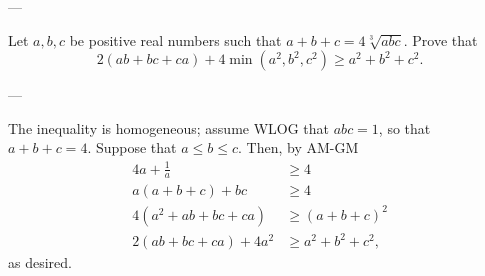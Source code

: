 
---

Let $a,b,c$ be positive real numbers such that $a+b+c=4\sqrt[3]{abc}$. Prove that \[2(ab+bc+ca)+4\min(a^2,b^2,c^2)\ge a^2+b^2+c^2.\]

---

The inequality is homogeneous; assume WLOG that $abc=1$, so that $a+b+c=4$. Suppose that $a\le b\le c$. Then, by AM-GM
\begin{align*}
    4a+\frac1a&\ge 4\\
    a(a+b+c)+bc&\ge 4\\
    4(a^2+ab+bc+ca)&\ge (a+b+c)^2\\
    2(ab+bc+ca)+4a^2&\ge a^2+b^2+c^2,
\end{align*}
as desired.
